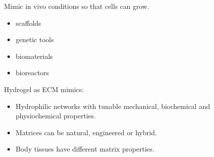 Mimic in vivo conditions so that cells can grow.
\begin{itemize}
    \item scaffolds
    \item genetic tools
    \item biomaterials
    \item bioreactors
\end{itemize}
\vspace{2mm}
Hydrogel as ECM mimics:
\begin{itemize}
    \item Hydrophilic networks with tunable mechanical, biochemical and physiochemical properties.
    \item Matrices can be natural, engineered or hybrid.
    \item Body tissues have different matrix properties.
\end{itemize}